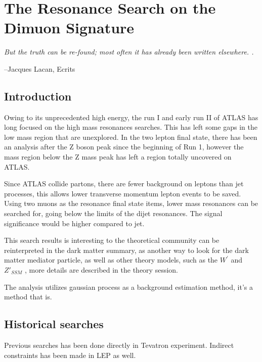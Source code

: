 \chapter{The Resonance Search on the Dimuon Signature}
\label{chapter:dimuon}

\epigraph{\textit{But the truth can be re-found; most often it has already been written elsewhere. .}}{--Jacques Lacan, Ecrits}

\section{Introduction}

    Owing to its unprecedented high energy, the run I and early run II of ATLAS has long focused on the high mass resonances searches. This has left some gaps in the low mass region that are unexplored. In the two lepton final state, there has been an analysis after the Z boson peak since the beginning of Run 1, however the mass region below the Z mass peak has left a region totally uncovered on ATLAS.
    
    Since ATLAS collide partons, there are fewer background on leptons than jet processes, this allows lower transverse momentum lepton events to be saved. Using two muons as the resonance final state items, lower mass resonances can be searched for, going below the limits of the dijet resonances. The signal significance would be higher compared to jet. 

    This search results is interesting to the theoretical community can be reinterpreted in the dark matter summary, as another way to look for the dark matter mediator particle, as well as other theory models, such as the $W^{'}$ and $Z'_{SSM}$ , more details are described in the theory session. 

    The analysis utilizes gaussian process as a background estimation method, it's a method that is. 

\section{Historical searches}    
    Previous searches has been done directly in Tevatron experiment. Indirect constraints has been made in LEP as well. 

